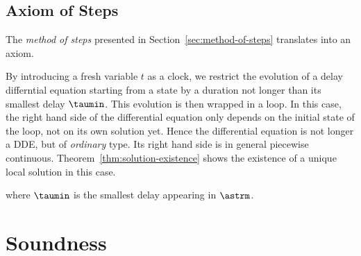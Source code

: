 
    \subsection{Axiom of Steps}
        \label{sec:axiom-of-steps}

        The \emph{method of steps} presented in Section~\ref{sec:method-of-steps} translates into an axiom.

        By introducing a fresh variable $t$ as a clock, we restrict the evolution of a delay differntial equation starting from a state by a duration not longer than its smallest delay $\taumin$. This evolution is then wrapped in a loop.
        In this case, the right hand side of the differential equation only depends on the initial state of the loop, not on its own solution yet. Hence the differential equation is not longer a DDE, but of \emph{ordinary} type.
        Its right hand side is in general piecewise continuous.
        Theorem~\ref{thm:solution-existence} shows the existence of a unique local solution in this case.

        \begin{calculus}
        \end{calculus}

        where $\taumin$ is the smallest delay appearing in $\astrm$.



\section{Soundness}
    \label{sec:soundness}


